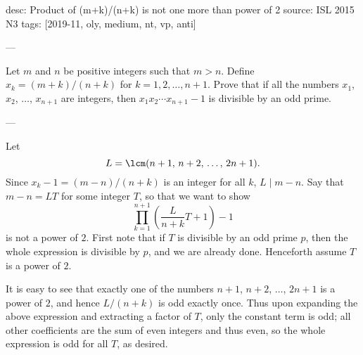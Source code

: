 desc: Product of (m+k)/(n+k) is not one more than power of 2
source: ISL 2015 N3
tags: [2019-11, oly, medium, nt, vp, anti]

---

Let $m$ and $n$ be positive integers such that $m>n$. Define $x_k=(m+k)/(n+k)$ for $k=1,2,\ldots,n+1$. Prove that if all the numbers $x_1$, $x_2$, $\ldots$, $x_{n+1}$ are integers, then $x_1x_2\cdots x_{n+1}-1$ is divisible by an odd prime.

---

Let \[L=\lcm(n+1,\,n+2,\,\ldots,\,2n+1).\]
Since $x_k-1=(m-n)/(n+k)$ is an integer for all $k$, $L\mid m-n$. Say that $m-n=LT$ for some integer $T$, so that we want to show \[\prod_{k=1}^{n+1}\left(\frac L{n+k}T+1\right)-1\]
is not a power of $2$. First note that if $T$ is divisible by an odd prime $p$, then the whole expression is divisible by $p$, and we are already done. Henceforth assume $T$ is a power of $2$.

It is easy to see that exactly one of the numbers $n+1$, $n+2$, $\ldots$, $2n+1$ is a power of $2$, and hence $L/(n+k)$ is odd exactly once. Thus upon expanding the above expression and extracting a factor of $T$, only the constant term is odd; all other coefficients are the sum of even integers and thus even, so the whole expression is odd for all $T$, as desired.
